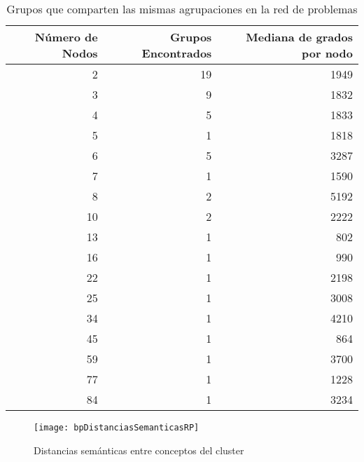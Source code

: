 \begin{table}[htb]
\centering
\caption{Grupos que comparten las mismas agrupaciones en la red de problemas}
\label{gruposRP}
\begin{tabular}{@{}rrr@{}}
\toprule
Número de Nodos & Grupos Encontrados & Mediana de grados por nodo \\ \midrule
2               & 19                 & 1949                       \\
3               & 9                  & 1832                       \\
4               & 5                  & 1833                       \\
5               & 1                  & 1818                       \\
6               & 5                  & 3287                       \\
7               & 1                  & 1590                       \\
8               & 2                  & 5192                       \\
10              & 2                  & 2222                       \\
13              & 1                  & 802                        \\
16              & 1                  & 990                        \\
22              & 1                  & 2198                       \\
25              & 1                  & 3008                       \\
34              & 1                  & 4210                       \\
45              & 1                  & 864                        \\
59              & 1                  & 3700                       \\
77              & 1                  & 1228                       \\
84              & 1                  & 3234                       \\ \bottomrule
\end{tabular}
\end{table}

\begin{figure}[ht]
\caption{Distancias semánticas entre conceptos del cluster}
\label{fig:bpDistanciasSemanticasRP}
\centering
\texttt{[image: bpDistanciasSemanticasRP]}
\end{figure}

